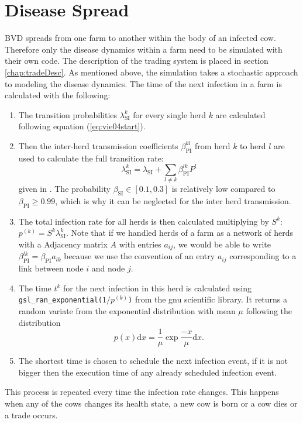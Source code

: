 \section{Disease Spread}
BVD spreads from one farm to another within the body of an infected cow. Therefore only the disease dynamics within a farm need to be simulated with their own code. The description of the trading system is placed in section \ref{chap:tradeDesc}. As mentioned above, the simulation takes a stochastic approach to modeling the disease dynamics. The time of the next infection in a farm is calculated with the following: \\
\begin{enumerate}
\item The transition probabilities $\lambda_\text{SI}^k$ for every single herd $k$ are calculated following equation (\ref{eq:vie04start}).
\item Then the inter-herd transmission coefficients $\beta^{kl}_\text{PI}$ from herd $k$ to herd $l$ are used to calculate the full transition rate:
\begin{equation}
\lambda_\text{SI}^k = \lambda_\text{SI} + \sum_{l \neq k} \beta^{lk}_\text{PI} P^l \label{eq:vie04}
\end{equation}
given in \citep{VIE04}. The probability $\beta_\text{SI} \in [0.1,0.3] $ is relatively low compared to $\beta_\text{PI} \geq 0.99$, which is why it can be neglected for the inter herd transmission.
\item The total infection rate for all herds is then calculated multiplying by $S^k$: $p^{(k)} = S^k \lambda_\text{SI}^k $. Note that if we handled herds of a farm as a network of herds with a Adjacency matrix $A$ with entries $a_{ij}$, we would be able to write $\beta_\text{PI}^{lk}= \beta_\text{PI} a_{lk}$ because we use the convention of an entry $a_{ij}$ corresponding to a link between node $i$ and node $j$.
\item The time $t^k$ for the next infection in this herd is calculated using\\ {\tt gsl\_ran\_exponential($1/p^{(k)}$)} from the gnu scientific library. \glqq It returns a random variate from the exponential distribution with mean $\mu$\grqq \citep{webExponentialDistrib} following the distribution 
\begin{equation}
p(x)\text{d}x = \frac{1}{\mu} \exp{\frac{-x}{\mu}}\text{d}x.
\end{equation}

\item The shortest time is chosen to schedule the next infection event, if it is not bigger then the execution time of any already scheduled infection event.
\end{enumerate}
This process is repeated every time the infection rate changes. This happens when any of the cows changes its health state, a new cow is born or a cow dies or a trade occurs. 

